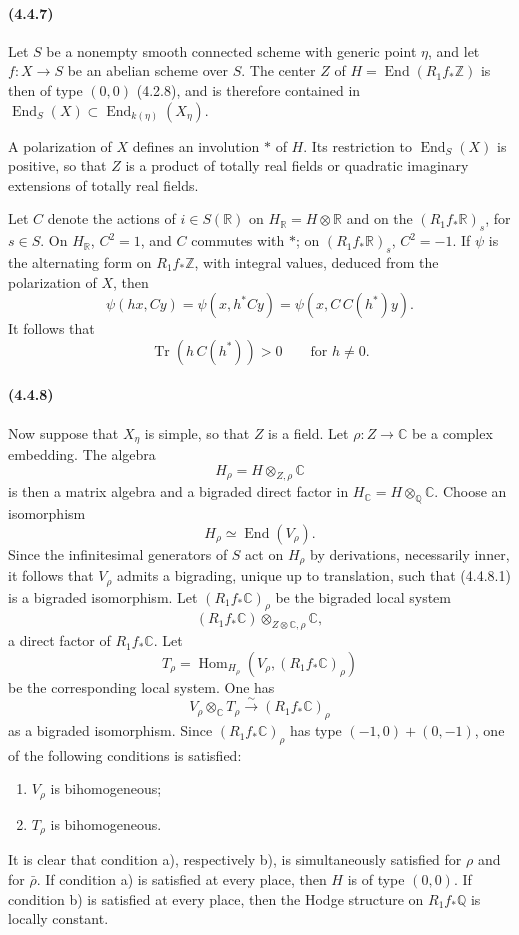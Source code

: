 \documentclass[10pt]{article}
\newcommand{\C}{\mathbb C}
\newcommand{\Q}{\mathbb Q}
\newcommand{\Z}{\mathbb Z}
\newcommand{\Hom}{\operatorname{Hom}}
\newcommand{\iso}{\xrightarrow{\sim}}
\newcommand{\R}{\mathbb R}
\providecommand{\End}{\operatorname{End}}
\newcommand{\Tr}{\operatorname{Tr}}
\begin{document}
\paragraph{(4.4.7)} Let $S$ be a nonempty smooth connected scheme with generic point $\eta$, and let $f:X\to S$ be an abelian scheme over $S$. The center $Z$ of $H=\End(R_1f_*\Z)$ is then of type $(0,0)$ (4.2.8), and is therefore contained in $\End_S(X)\subset \End_{k(\eta)}(X_\eta)$.

A polarization of $X$ defines an involution $*$ of $H$. Its restriction to $\End_S(X)$ is positive, so that $Z$ is a product of totally real fields or quadratic imaginary extensions of totally real fields.

Let $C$ denote the actions of $i\in S(\R)$ on $H_\R=H\otimes\R$ and on the $(R_1f_*\R)_s$, for $s\in S$. On $H_\R$, $C^2=1$, and $C$ commutes with $*$; on $(R_1f_*\R)_s$, $C^2=-1$. If $\psi$ is the alternating form on $R_1f_*\Z$, with integral values, deduced from the polarization of $X$, then
\[
\psi(hx,Cy)=\psi(x,h^*Cy)=\psi(x,C\,C(h^*)y).
\]
It follows that
\[
\tag{4.4.7.1}
\Tr(h\,C(h^*))>0\qquad\text{for }h\ne0.
\]

\paragraph{(4.4.8)} Now suppose that $X_\eta$ is simple, so that $Z$ is a field. Let $\rho:Z\to\C$ be a complex embedding. The algebra
\[
H_\rho=H\otimes_{Z,\rho}\C
\]
is then a matrix algebra and a bigraded direct factor in $H_\C=H\otimes_\Q\C$. Choose an isomorphism
\[
\tag{4.4.8.1}
H_\rho\simeq\End(V_\rho).
\]
Since the infinitesimal generators of $S$ act on $H_\rho$ by derivations, necessarily inner, it follows that $V_\rho$ admits a bigrading, unique up to translation, such that (4.4.8.1) is a bigraded isomorphism. Let $(R_1f_*\C)_\rho$ be the bigraded local system
\[
(R_1f_*\C)\otimes_{Z\otimes\C,\rho}\C,
\]
a direct factor of $R_1f_*\C$. Let
\[
T_\rho=\Hom_{H_\rho}(V_\rho,(R_1f_*\C)_\rho)
\]
be the corresponding local system. One has
\[
\tag{4.4.8.2}
V_\rho\otimes_\C T_\rho\iso (R_1f_*\C)_\rho
\]
as a bigraded isomorphism. Since $(R_1f_*\C)_\rho$ has type $(-1,0)+(0,-1)$, one of the following conditions is satisfied:
\begin{enumerate}[label=\alph*)]
\item $V_\rho$ is bihomogeneous;
\item $T_\rho$ is bihomogeneous.
\end{enumerate}
It is clear that condition a), respectively b), is simultaneously satisfied for $\rho$ and for $\bar\rho$. If condition a) is satisfied at every place, then $H$ is of type $(0,0)$. If condition b) is satisfied at every place, then the Hodge structure on $R_1f_*\Q$ is locally constant.
\end{document}
